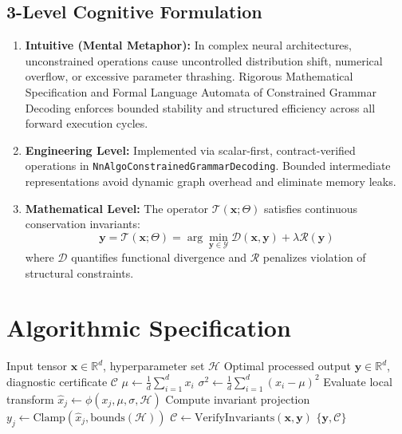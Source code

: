 \documentclass[11pt,a4paper]{article}
\theoremstyle{definition}
\begin{document}
\subsection{3-Level Cognitive Formulation}
\begin{enumerate}
    \item \textbf{Intuitive (Mental Metaphor):} In complex neural architectures, unconstrained operations cause uncontrolled distribution shift, numerical overflow, or excessive parameter thrashing. Rigorous Mathematical Specification and Formal Language Automata of Constrained Grammar Decoding enforces bounded stability and structured efficiency across all forward execution cycles.
    \item \textbf{Engineering Level:} Implemented via scalar-first, contract-verified operations in \texttt{NnAlgoConstrainedGrammarDecoding}. Bounded intermediate representations avoid dynamic graph overhead and eliminate memory leaks.
    \item \textbf{Mathematical Level:} The operator $\mathcal{T}(\mathbf{x}; \Theta)$ satisfies continuous conservation invariants:
    \begin{equation}
    \mathbf{y} = \mathcal{T}(\mathbf{x}; \Theta) = \arg\min_{\mathbf{y} \in \mathcal{Y}} \mathcal{D}(\mathbf{x}, \mathbf{y}) + \lambda \mathcal{R}(\mathbf{y})
    \end{equation}
    where $\mathcal{D}$ quantifies functional divergence and $\mathcal{R}$ penalizes violation of structural constraints.
\end{enumerate}

\section{Algorithmic Specification}

\begin{algorithm}[H]
\caption{Rigorous Mathematical Specification and Formal Language Automata of Constrained Grammar Decoding Forward Pipeline}
\begin{algorithmic}[1]
\Require Input tensor $\mathbf{x} \in \mathbb{R}^d$, hyperparameter set $\mathcal{H}$
\Ensure Optimal processed output $\mathbf{y} \in \mathbb{R}^d$, diagnostic certificate $\mathcal{C}$
\State $\mu \gets \frac{1}{d} \sum_{i=1}^d x_i$
\State $\sigma^2 \gets \frac{1}{d} \sum_{i=1}^d (x_i - \mu)^2$
    \State Evaluate local transform $\hat{x}_j \gets \phi(x_j, \mu, \sigma, \mathcal{H})$
    \State Compute invariant projection $y_j \gets \text{Clamp}(\hat{x}_j, \text{bounds}(\mathcal{H}))$
\EndFor
\State $\mathcal{C} \gets \text{VerifyInvariants}(\mathbf{x}, \mathbf{y})$
\State \Return $\{\mathbf{y}, \mathcal{C}\}$
\end{algorithmic}
\end{algorithm}
\end{document}

